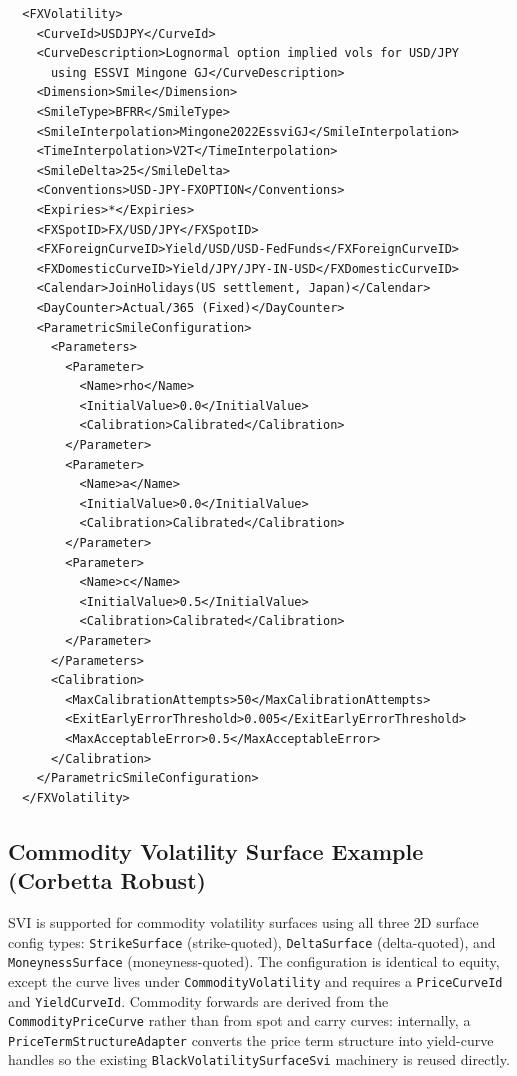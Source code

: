 \documentclass{amsart}
\theoremstyle{plain}
\numberwithin{equation}{section}
\begin{document}
\begin{verbatim}
  <FXVolatility>
    <CurveId>USDJPY</CurveId>
    <CurveDescription>Lognormal option implied vols for USD/JPY
      using ESSVI Mingone GJ</CurveDescription>
    <Dimension>Smile</Dimension>
    <SmileType>BFRR</SmileType>
    <SmileInterpolation>Mingone2022EssviGJ</SmileInterpolation>
    <TimeInterpolation>V2T</TimeInterpolation>
    <SmileDelta>25</SmileDelta>
    <Conventions>USD-JPY-FXOPTION</Conventions>
    <Expiries>*</Expiries>
    <FXSpotID>FX/USD/JPY</FXSpotID>
    <FXForeignCurveID>Yield/USD/USD-FedFunds</FXForeignCurveID>
    <FXDomesticCurveID>Yield/JPY/JPY-IN-USD</FXDomesticCurveID>
    <Calendar>JoinHolidays(US settlement, Japan)</Calendar>
    <DayCounter>Actual/365 (Fixed)</DayCounter>
    <ParametricSmileConfiguration>
      <Parameters>
        <Parameter>
          <Name>rho</Name>
          <InitialValue>0.0</InitialValue>
          <Calibration>Calibrated</Calibration>
        </Parameter>
        <Parameter>
          <Name>a</Name>
          <InitialValue>0.0</InitialValue>
          <Calibration>Calibrated</Calibration>
        </Parameter>
        <Parameter>
          <Name>c</Name>
          <InitialValue>0.5</InitialValue>
          <Calibration>Calibrated</Calibration>
        </Parameter>
      </Parameters>
      <Calibration>
        <MaxCalibrationAttempts>50</MaxCalibrationAttempts>
        <ExitEarlyErrorThreshold>0.005</ExitEarlyErrorThreshold>
        <MaxAcceptableError>0.5</MaxAcceptableError>
      </Calibration>
    </ParametricSmileConfiguration>
  </FXVolatility>
\end{verbatim}

\subsection{Commodity Volatility Surface Example (Corbetta Robust)}

SVI is supported for commodity volatility surfaces using all three 2D surface config types:
\texttt{StrikeSurface} (strike-quoted), \texttt{DeltaSurface} (delta-quoted), and
\texttt{MoneynessSurface} (moneyness-quoted). The configuration is identical to equity,
except the curve lives under \texttt{CommodityVolatility} and requires a
\texttt{PriceCurveId} and \texttt{YieldCurveId}. Commodity forwards are derived from
the \texttt{CommodityPriceCurve} rather than from spot and carry curves: internally, a
\texttt{PriceTermStructureAdapter} converts the price term structure into yield-curve
handles so the existing \texttt{BlackVolatilitySurfaceSvi} machinery is reused directly.
\end{document}
